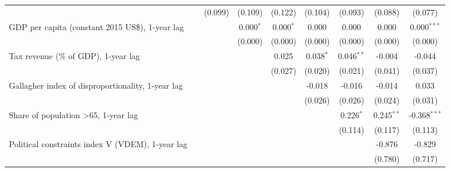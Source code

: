 \begin{table}[htbp]
\begin{tabular}{lcccccccc}
                                                                                &               & (0.099)       & (0.109)       & (0.122)      & (0.104)     & (0.093)      & (0.088)      & (0.077)\\   
      GDP per capita (constant 2015 US\$), 1-year lag                           &               &               & 0.000$^{*}$   & 0.000$^{*}$  & 0.000       & 0.000        & 0.000        & 0.000$^{***}$\\   
                                                                                &               &               & (0.000)       & (0.000)      & (0.000)     & (0.000)      & (0.000)      & (0.000)\\   
      Tax revenue (\% of GDP), 1-year lag                                       &               &               &               & 0.025        & 0.038$^{*}$ & 0.046$^{**}$ & -0.004       & -0.044\\   
                                                                                &               &               &               & (0.027)      & (0.020)     & (0.021)      & (0.041)      & (0.037)\\   
      Gallagher index of disproportionality, 1-year lag                         &               &               &               &              & -0.018      & -0.016       & -0.014       & 0.033\\   
                                                                                &               &               &               &              & (0.026)     & (0.026)      & (0.024)      & (0.031)\\   
      Share of population >65, 1-year lag                                       &               &               &               &              &             & 0.226$^{*}$  & 0.245$^{**}$ & -0.368$^{***}$\\   
                                                                                &               &               &               &              &             & (0.114)      & (0.117)      & (0.113)\\   
      Political constraints index V (VDEM), 1-year lag                          &               &               &               &              &             &              & -0.876       & -0.829\\   
                                                                                &               &               &               &              &             &              & (0.780)      & (0.717)\\   

\end{tabular}
\end{table}
